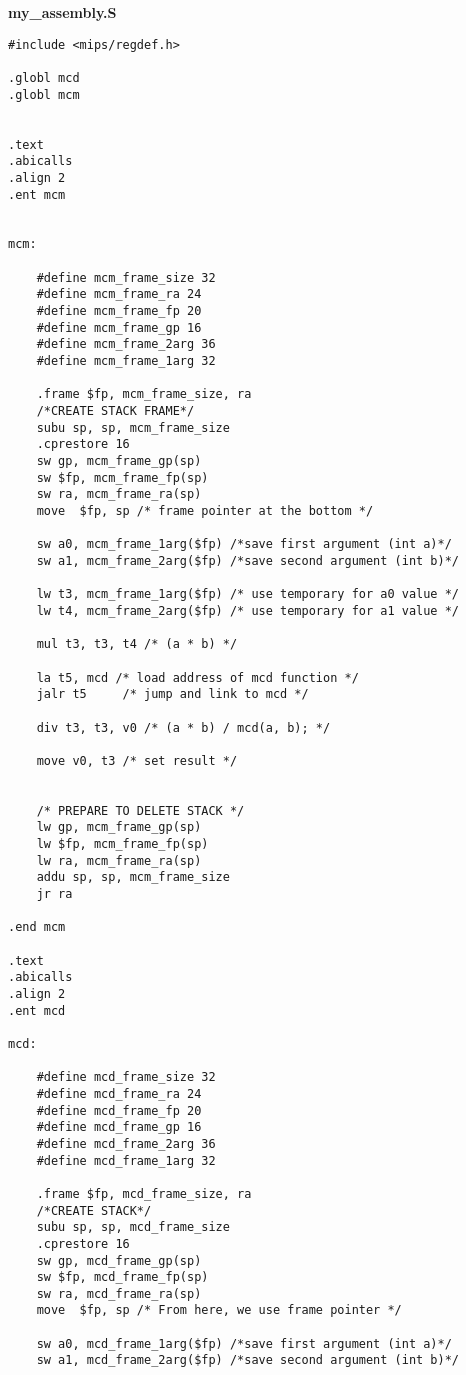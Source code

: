 \documentclass[a4paper,10pt]{article}
\begin{document}
\textbf{my\_assembly.S}
\begin{lstlisting}[style=mips]
#include <mips/regdef.h>

.globl mcd
.globl mcm


.text
.abicalls
.align 2
.ent mcm


mcm:

    #define mcm_frame_size 32
    #define mcm_frame_ra 24
    #define mcm_frame_fp 20
    #define mcm_frame_gp 16
    #define mcm_frame_2arg 36
    #define mcm_frame_1arg 32
    
    .frame $fp, mcm_frame_size, ra
    /*CREATE STACK FRAME*/
    subu sp, sp, mcm_frame_size
    .cprestore 16
    sw gp, mcm_frame_gp(sp)
    sw $fp, mcm_frame_fp(sp)
    sw ra, mcm_frame_ra(sp)
    move  $fp, sp /* frame pointer at the bottom */
      
    sw a0, mcm_frame_1arg($fp) /*save first argument (int a)*/
    sw a1, mcm_frame_2arg($fp) /*save second argument (int b)*/

    lw t3, mcm_frame_1arg($fp) /* use temporary for a0 value */
    lw t4, mcm_frame_2arg($fp) /* use temporary for a1 value */
   
    mul t3, t3, t4 /* (a * b) */
    
    la t5, mcd /* load address of mcd function */
    jalr t5     /* jump and link to mcd */
    
    div t3, t3, v0 /* (a * b) / mcd(a, b); */

    move v0, t3 /* set result */


    /* PREPARE TO DELETE STACK */
    lw gp, mcm_frame_gp(sp)
    lw $fp, mcm_frame_fp(sp)
    lw ra, mcm_frame_ra(sp)
    addu sp, sp, mcm_frame_size
    jr ra
    
.end mcm
   
.text
.abicalls
.align 2
.ent mcd

mcd:

    #define mcd_frame_size 32
    #define mcd_frame_ra 24
    #define mcd_frame_fp 20
    #define mcd_frame_gp 16
    #define mcd_frame_2arg 36
    #define mcd_frame_1arg 32
    
    .frame $fp, mcd_frame_size, ra
    /*CREATE STACK*/
    subu sp, sp, mcd_frame_size
    .cprestore 16
    sw gp, mcd_frame_gp(sp)
    sw $fp, mcd_frame_fp(sp)
    sw ra, mcd_frame_ra(sp)
    move  $fp, sp /* From here, we use frame pointer */
 
    sw a0, mcd_frame_1arg($fp) /*save first argument (int a)*/
    sw a1, mcd_frame_2arg($fp) /*save second argument (int b)*/


\end{lstlisting}
\end{document}
